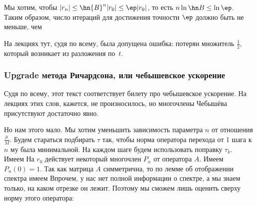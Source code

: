 \documentclass[a4paper]{article}
\begin{document}
Мы хотим, чтобы $|r_n| \le \hn{B}^n |r_0| \le \ep |r_0|$, то есть
$n\ln \hn B \le \ln \ep$.  Таким образом, число итераций для
достижения точности $\ep$ должно быть не меньше, чем 

\begin{petit}
На лекциях тут, судя по всему, была допущена ошибка: потерян множитель
$\frac12$, который возникает из разложения по~$t$.
\end{petit}

\subsubsection{Upgrade метода Ричардсона, или чебышевское ускорение}

\begin{petit}
Судя по всему, этот текст соответствует билету про чебышевское
ускорение. На лекциях этих слов, кажется, не произносилось, но
многочлены Чебышёва присутствуют достаточно явно.
\end{petit}

Но нам этого мало. Мы хотим уменьшить зависимость параметра $n$ от
отношения $\frac{\mu}{M}$.  Будем стараться подбирать $\tau$ так,
чтобы норма оператора перехода от 1 шага к $n$ му была минимальной.
На каждом шаге будем использовать поправку $\tau_k$.  Имеем   На $r_0$
действует некоторый многочлен $P_n$ от оператора $A$. Имеем
$P_n(0)=1$.  Так как матрица $A$ симметрична, то по лемме об
отображении спектра имеем   Впрочем, у нас нет полной информации о спектре, а мы
знаем только, на каком отрезке он лежит.  Поэтому мы сможем лишь
оценить сверху норму этого оператора: 
\end{document}
